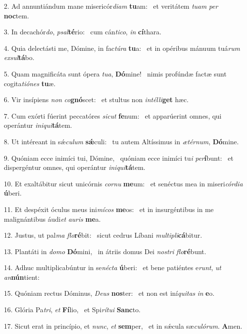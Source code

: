 2. Ad annuntiándum mane misericór\textit{di}\textit{am} \textbf{tu}am: \ast\  et veritátem \textit{tu}\textit{am} \textit{per} \textbf{noc}tem.\

3. In decachór\textit{do}, \textit{psal}\textbf{té}rio: \ast\  cum cán\textit{ti}\textit{co}, \textit{in} \textbf{cí}thara.\

4. Quia delectásti me, Dómine, in fac\textit{tú}\textit{ra} \textbf{tu}a: \ast\  et in opéribus mánuum tuá\textit{rum} \textit{ex}\textit{sul}\textbf{tá}bo.\

5. Quam magnificáta sunt ópera \textit{tu}\textit{a}, \textbf{Dó}mine! \ast\  nimis profúndæ factæ sunt cogita\textit{ti}\textit{ó}\textit{nes} \textbf{tu}æ.\

6. Vir insípiens \textit{non} \textit{co}\textbf{gnó}scet: \ast\  et stultus non \textit{in}\textit{tél}\textit{li}\textbf{get} hæc.\

7. Cum exórti fúerint peccatóres \textit{sic}\textit{ut} \textbf{fe}num: \ast\  et apparúerint omnes, qui operántur \textit{in}\textit{i}\textit{qui}\textbf{tá}tem.\

8. Ut intéreant in sǽ\textit{cu}\textit{lum} \textbf{sǽ}culi: \ast\  tu autem Altíssimus in \textit{æ}\textit{tér}\textit{num}, \textbf{Dó}mine.\

9. Quóniam ecce inimíci tui, Dómine, \dag\  quóniam ecce inimíci tu\textit{i} \textit{per}\textbf{í}bunt: \ast\  et dispergéntur omnes, qui operántur \textit{in}\textit{i}\textit{qui}\textbf{tá}tem.\

10. Et exaltábitur sicut unicórnis \textit{cor}\textit{nu} \textbf{me}um: \ast\  et senéctus mea in miseri\textit{cór}\textit{di}\textit{a} \textbf{ú}beri.\

11. Et despéxit óculus meus ini\textit{mí}\textit{cos} \textbf{me}os: \ast\  et in insurgéntibus in me malignántibus áudi\textit{et} \textit{au}\textit{ris} \textbf{me}a.\

12. Justus, ut pal\textit{ma} \textit{flo}\textbf{ré}bit: \ast\  sicut cedrus Líbani \textit{mul}\textit{ti}\textit{pli}\textbf{cá}bitur.\

13. Plantáti in \textit{do}\textit{mo} \textbf{Dó}mini, \ast\  in átriis domus Dei \textit{nos}\textit{tri} \textit{flo}\textbf{ré}bunt.\

14. Adhuc multiplicabúntur in se\textit{néc}\textit{ta} \textbf{ú}beri: \ast\  et bene patiéntes e\textit{runt}, \textit{ut} \textit{an}\textbf{nún}tient:\

15. Quóniam rectus Dóminus, \textit{De}\textit{us} \textbf{nos}ter: \ast\  et non est iní\textit{qui}\textit{tas} \textit{in} \textbf{e}o.\

16. Glória Pa\textit{tri}, \textit{et} \textbf{Fí}lio, \ast\  et Spi\textit{rí}\textit{tu}\textit{i} \textbf{Sanc}to.\

17. Sicut erat in princípio, et \textit{nunc}, \textit{et} \textbf{sem}per, \ast\  et in sǽcula sæ\textit{cu}\textit{ló}\textit{rum}. \textbf{A}men.\

